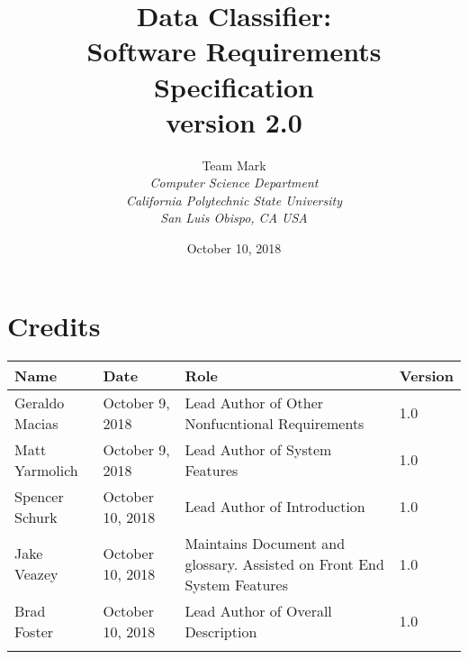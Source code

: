 \documentclass[12pt,oneside,letterpaper]{article}
\begin{document}
\title{\bfseries Data Classifier: \\
Software Requirements Specification\\
version 2.0}

\author {
\large{Team Mark}\\
\emph{Computer Science Department}\\
\emph{California Polytechnic State University}\\
\emph{San Luis Obispo, CA USA}\\
}

\date{October 10, 2018}
\maketitle \thispagestyle{empty}


\pagebreak
\tableofcontents



\section*{Credits}
\begin{tabular}{|l|l|p{2.5in}|l|}
\hline
\textbf{Name}&\textbf{Date}&\textbf{Role}&\textbf{Version}\\
\hline
Geraldo Macias&October 9, 2018&Lead Author of Other Nonfucntional Requirements&1.0\\
\hline
Matt Yarmolich&October 9, 2018&Lead Author of System Features&1.0\\
\hline
Spencer Schurk&October 10, 2018&Lead Author of Introduction&1.0\\
\hline
Jake Veazey&October 10, 2018&Maintains Document and glossary. Assisted on Front End System Features&1.0\\
\hline
Brad Foster&October 10, 2018&Lead Author of Overall Description&1.0\\
\hline
&&&\\
\hline
\end{tabular}
\end{document}
